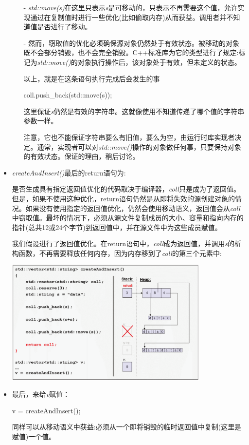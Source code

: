 \begin{itemize}
	\begin{itemize}
		\item[-] \textit{std::move(s)}在这里只表示\textit{s}是可移动的，只表示不再需要这个值，允许实现通过在复制值时进行一些优化(比如偷取内存)从而获益。调用者并不知道值是否进行了移动。
		\item[-] 然而，窃取值的优化必须确保源对象仍然处于有效状态。被移动的对象既不会部分销毁，也不会完全销毁。C++标准库为它的类型进行了规定:标记为\textit{std::move()}的对象执行操作后，该对象处于有效，但未定义的状态。

		以上，就是在这条语句执行完成后会发生的事
\begin{cppcode}
coll.push_back(std::move(s));
\end{cppcode}
		这里保证\textit{s}仍然是有效的字符串。这就像使用不知道传递了哪个值的字符串参数一样。

		注意，它也不能保证字符串要么有旧值，要么为空，由运行时库实现者决定。通常，实现者可以对\textit{std::move()}操作的对象做任何事，只要保持对象的有效状态。保证的理由，稍后讨论。
	\end{itemize}

	\item \textit{createAndInsert()}最后的return语句为:

	\begin{cppcode}
	return coll;
}
	\end{cppcode}
	是否生成具有指定返回值优化的代码取决于编译器，\textit{coll}只是成为了返回值。但是，如果不使用这种优化，return语句仍然是从即将失效的源创建对象的情况。如果没有使用指定的返回值优化，仍然会使用移动语义，返回值会从\textit{coll}中窃取值。最坏的情况下，必须从源文件复制成员的大小、容量和指向内存的指针(总共12或24个字节)到返回值中，并在源文件中为这些成员赋值。

	我们假设进行了返回值优化。在return语句中，\textit{coll}成为返回值，并调用\textit{s}的析构函数，不再需要释放任何内存，因为内存移到了\textit{coll}的第三个元素中:
\begin{center}
		\includegraphics[width=0.8\textwidth]{part1/ch1/images/15}
	\end{center}
	\item 最后，来给\textit{v}赋值：
\begin{cppcode}
v = createAndInsert();
\end{cppcode}
	同样可以从移动语义中获益:必须从一个即将销毁的临时返回值中复制(这里是赋值)一个值。


\end{itemize}
